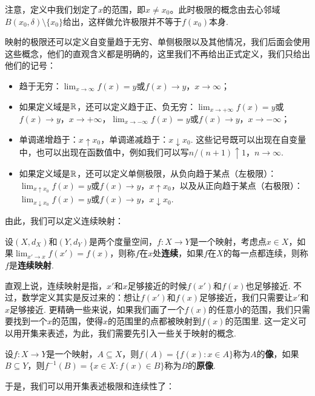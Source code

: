 注意，定义中我们划定了$x$的范围，即$x\neq x_0$。此时极限的概念由去心邻域$B(x_0,\delta)\setminus\{x_0\}$给出，这样做允许极限并不等于$f(x_0)$本身. 

\begin{remark}
映射的极限还可以定义自变量趋于无穷、单侧极限以及其他情况，我们后面会使用这些概念，他们的直观含义都是明确的，这里我们不再给出正式定义，我们只给出他们的记号：
\begin{itemize}
    \item 趋于无穷：$\lim_{x\to\infty}f(x)=y$或$f(x)\to y$，$x\to\infty$；
    \item 如果定义域是$\mathbb{R}$，还可以定义趋于正、负无穷：$\lim_{x\to+\infty}f(x)=y$或$f(x)\to y$，$x\to+\infty$，$\lim_{x\to-\infty}f(x)=y$或$f(x)\to y$，$x\to-\infty$；
    \item 单调递增趋于：$x\uparrow x_0$，单调递减趋于：$x\downarrow x_0$. 这些记号既可以出现在自变量中，也可以出现在函数值中，例如我们可以写$n/(n+1)\uparrow 1$，$n\to\infty$.
    \item 如果定义域是$\mathbb{R}$，还可以定义单侧极限，从负向趋于某点（左极限）：$\lim_{x\uparrow x_0}f(x)=y$或$f(x)\to y$，$x\uparrow x_0$，以及从正向趋于某点（右极限）：$\lim_{x\downarrow x_0}f(x)=y$或$f(x)\to y$，$x\downarrow x_0$.
\end{itemize}
\end{remark}

由此，我们可以定义连续映射：
\begin{definition}[连续映射]
    设$(X,d_X)$和$(Y,d_Y)$是两个度量空间，$f:X\to Y$是一个映射，考虑点$x\in X$，如果$\lim_{x'\to x}f(x')=f(x)$，则称$f$在$x$处\textbf{连续}，如果$f$在$X$的每一点都连续，则称$f$是\textbf{连续映射}.
\end{definition}

直观上说，连续映射是指，$x'$和$x$足够接近的时候$f(x')$和$f(x)$也足够接近. 不过，数学定义其实是反过来的：想让$f(x')$和$f(x)$足够接近，我们只需要让$x'$和$x$足够接近. 更精确一些来说，如果我们画了一个$f(x)$的任意小的范围，我们只需要找到一个$x$的范围，使得$x$的范围里的点都被映射到$f(x)$的范围里. 这一定义可以用开集来表述，为此，我们需要先引入一些关于映射的概念. 

\begin{definition}[像，原像]
    设$f:X\to Y$是一个映射，$A\subseteq X$，则$f(A)=\{f(x):x\in A\}$称为$A$的\textbf{像}，如果$B\subseteq Y$，则$f^{-1}(B)=\{x\in X:f(x)\in B\}$称为$B$的\textbf{原像}. 
\end{definition}

于是，我们可以用开集表述极限和连续性了：

